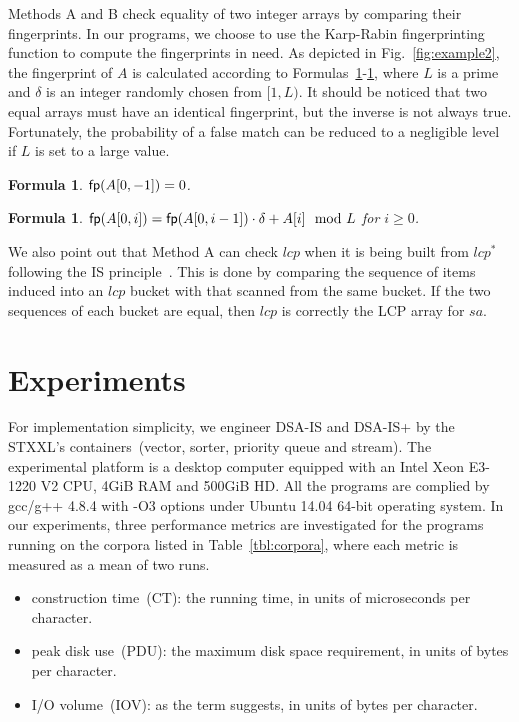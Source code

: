 \documentclass[10pt,journal,compsoc]{IEEEtran}
\newtheorem{formula}[theorem]{Formula}
\begin{document}
Methods A and B check equality of two integer arrays by comparing their fingerprints. In our programs, we choose to use the Karp-Rabin fingerprinting function to compute the fingerprints in need. As depicted in Fig.~\ref{fig:example2}, the fingerprint of $A$ is calculated according to Formulas~\ref{formula:1}-\ref{formula:2}, where $L$ is a prime and $\delta$ is an integer randomly chosen from $[1, L)$. It should be noticed that two equal arrays must have an identical fingerprint, but the inverse is not always true. Fortunately, the probability of a false match can be reduced to a negligible level if $L$ is set to a large value. 

\begin{formula} \label{formula:1}${\sf fp}(A[0, -1]) = 0$. 
\end{formula}

\begin{formula} \label{formula:2}${\sf fp}(A[0, i]) = {\sf fp}(A[0, i - 1]) \cdot {\delta} + A[i]\mod L$ for $i \ge 0$.
\end{formula}

We also point out that Method A can check $lcp$ when it is being built from $lcp^*$ following the IS principle~\cite{Fischer11}. This is done by comparing the sequence of items induced into an $lcp$ bucket with that scanned from the same bucket. If the two sequences of each bucket are equal, then $lcp$ is correctly the LCP array for $sa$.

\section{Experiments} \label{sec:experiments}

For implementation simplicity, we engineer DSA-IS and DSA-IS+ by the STXXL's containers~(vector, sorter, priority queue and stream). The experimental platform is a desktop computer equipped with an Intel Xeon E3-1220 V2 CPU, 4GiB RAM and 500GiB HD. All the programs are complied by gcc/g++ 4.8.4 with -O3 options under Ubuntu 14.04 64-bit operating system. In our experiments, three performance metrics are investigated for the programs running on the corpora listed in Table~\ref{tbl:corpora}, where each metric is measured as a mean of two runs.

\begin{itemize}
	\item construction time~(CT): the running time, in units of microseconds per character.
	\item peak disk use~(PDU): the maximum disk space requirement, in units of bytes per character.
	\item I/O volume~(IOV): as the term suggests, in units of bytes per character.
\end{itemize}
\end{document}
